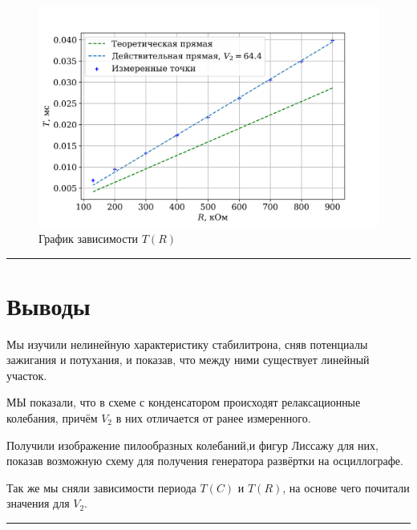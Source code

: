 \documentclass[a4paper,12pt]{article} %
\begin{document}
\begin{figure}
\begin{center}
\includegraphics[width=\textwidth]{plot4.png}
\caption{График зависимости $T(R)$}
\label{fig:plot4}
\end{center}
\end{figure}


\medskip\hrule\medskip

\section{Выводы}

Мы изучили нелинейную характеристику стабилитрона, сняв потенциалы зажигания и потухания, и показав, что между ними существует линейный участок.


МЫ показали, что в схеме с конденсатором происходят релаксационные колебания, причём $V_2$ в них отличается от ранее измеренного. 

Получили изображение пилообразных колебаний,и фигур Лиссажу для них, показав возможную схему для получения генератора развёртки на осциллографе.

Так же мы сняли зависимости периода $T(C)$ и $T(R)$, на основе чего почитали значения для $V_2$.

\medskip\hrule\medskip
\end{document}
